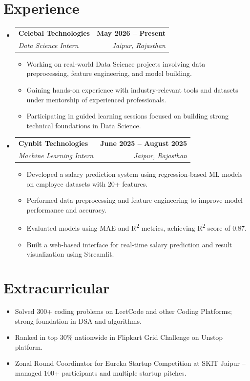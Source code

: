 \documentclass[letterpaper,11pt]{article}
\makeatletter
\newcommand{\resumeItem}[1]{\item\small{#1\vspace{0pt}}}
\newcommand{\resumeSubheading}[4]{
  \vspace{-2pt}\item
    \begin{tabular*}{1.0\textwidth}[t]{l@{\extracolsep{\fill}}r}
      \textbf{#1} & \textbf{\small #2} \\
      \textit{\small#3} & \textit{\small #4} \\
    \end{tabular*}\vspace{-5pt}
}
\newcommand{\resumeSubHeadingListStart}{\begin{itemize}[leftmargin=0.0in, label={}]}
\newcommand{\resumeSubHeadingListEnd}{\end{itemize}}
\newcommand{\resumeItemListStart}{\begin{itemize}[leftmargin=0.15in, itemsep=1pt, topsep=2pt]}
\newcommand{\resumeItemListEnd}{\end{itemize}\vspace{-2pt}}
\makeatother
\begin{document}
\section{Experience}
  \resumeSubHeadingListStart
    \resumeSubheading
      {Celebal Technologies}{May 2026 -- Present}
      {Data Science Intern}{Jaipur, Rajasthan}
      \resumeItemListStart
        \resumeItem{Working on real-world Data Science projects involving data preprocessing, feature engineering, and model building.}
        \resumeItem{Gaining hands-on experience with industry-relevant tools and datasets under mentorship of experienced professionals.}
        \resumeItem{Participating in guided learning sessions focused on building strong technical foundations in Data Science.}
      \resumeItemListEnd
    \resumeSubheading
      {Cynbit Technologies}{June 2025 -- August 2025}
      {Machine Learning Intern}{Jaipur, Rajasthan}
      \resumeItemListStart
        \resumeItem{Developed a salary prediction system using regression-based ML models on employee datasets with 20+ features.}
        \resumeItem{Performed data preprocessing and feature engineering to improve model performance and accuracy.}
        \resumeItem{Evaluated models using MAE and R\textsuperscript{2} metrics, achieving R\textsuperscript{2} score of 0.87.}
        \resumeItem{Built a web-based interface for real-time salary prediction and result visualization using Streamlit.}
      \resumeItemListEnd
  \resumeSubHeadingListEnd
  \vspace{-2pt}

\section{Extracurricular}
    \resumeSubHeadingListStart
      \resumeItemListStart
        \resumeItem{Solved 300+ coding problems on LeetCode and other Coding Platforms; strong foundation in DSA and algorithms.}
        \resumeItem{Ranked in top 30\% nationwide in Flipkart Grid Challenge on Unstop platform.}
        \resumeItem{Zonal Round Coordinator for Eureka Startup Competition at SKIT Jaipur -- managed 100+ participants and multiple startup pitches.}
      \resumeItemListEnd
    \resumeSubHeadingListEnd
\end{document}
